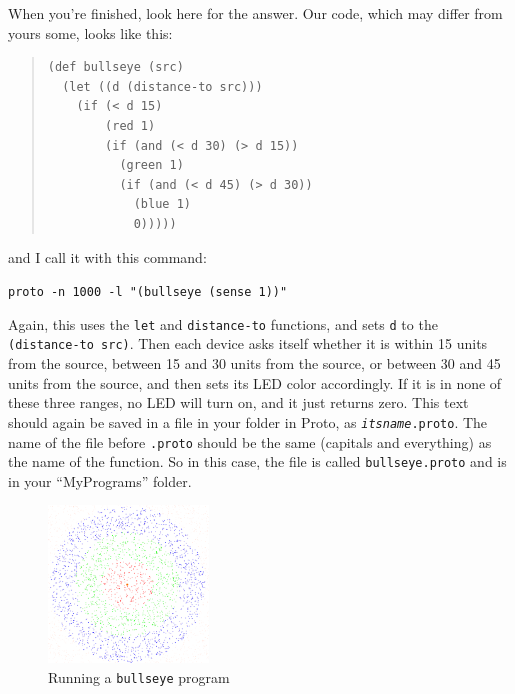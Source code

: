 \documentclass{article}
\newcommand\code[1]{\begin{center}\var{#1}\end{center}}
\newcommand\var[1]{{\tt #1}}
\begin{document}
When you're finished, look here for the answer.  Our code, which may
differ from yours some, looks like this:

\begin{quote}
\begin{verbatim}
(def bullseye (src)
  (let ((d (distance-to src)))
    (if (< d 15)
        (red 1)
        (if (and (< d 30) (> d 15))
          (green 1)
          (if (and (< d 45) (> d 30))
            (blue 1)
            0)))))
\end{verbatim}
\end{quote}

and I call it with this command:

\code{proto -n 1000 -l "(bullseye (sense 1))"}

Again, this uses the \var{let} and \var{distance-to} functions, and
sets \var{d} to the \var{(distance-to src)}.  Then each device asks
itself whether it is within 15 units from the source, between 15 and
30 units from the source, or between 30 and 45 units from the source,
and then sets its LED color accordingly.  If it is in none of these
three ranges, no LED will turn on, and it just returns zero.  This
text should again be saved in a file in your folder in Proto, as
\var{{\em itsname}.proto}.  The name of the file before \var{.proto}
should be the same (capitals and everything) as the name of the
function.  So in this case, the file is called \var{bullseye.proto}
and is in your ``MyPrograms'' folder.

\begin{figure}
  \vspace{-0.8cm}
  \includegraphics[width=0.38\textwidth]{figures/bullseye.png}
  \caption{Running a \var{bullseye} program}
  \vspace{-0.5cm}
  \label{f:bullseye}
\end{figure}
\end{document}
